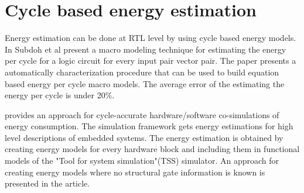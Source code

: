 \section{Cycle based energy estimation}
 Energy estimation can be done at RTL level by using cycle based energy models. In \cite{Energy_Gupta} Subdoh et al present a macro modeling technique for estimating the energy per cycle for a logic circuit for every input pair vector pair. The paper presents a automatically characterization procedure that can be used to build equation based energy per cycle macro models. The average error of the estimating the energy per cycle is under 20\%. \newline
 
 \cite{Energy_Ana} provides an approach for cycle-accurate hardware/software co-simulations of energy consumption. The simulation framework gets energy estimations for high level descriptions of embedded systems. The energy estimation is obtained by creating energy models for every hardware block and including them in functional models of the "Tool for system simulation"(TSS) simulator. An approach for creating energy models where no structural gate information is known is  presented in the article. 
 